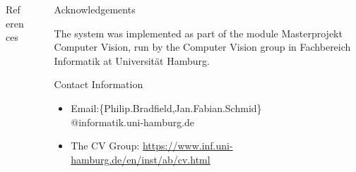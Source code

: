 \documentclass[final]{beamer}
\newlength{\sepwid}
\newlength{\onecolwid}
\newlength{\twocolwid}
\begin{document}
\begin{frame}[t]
\begin{columns}[t]
\begin{column}{\twocolwid}
\begin{columns}[t,totalwidth=\twocolwid]
\begin{column}{\onecolwid}
\begin{block}{References}
		\end{block}
		
	\end{column}	

	\begin{column}{\sepwid}\end{column} %

	\begin{column}{\onecolwid}



		\begin{block}{Acknowledgements}

		\small{The system was implemented as part of the module Masterprojekt Computer Vision, run by the Computer Vision group in Fachbereich Informatik at Universit\"{a}t Hamburg.}

		\end{block}



		\begin{block}{Contact Information}

		\begin{itemize}
			\item Email:\{Philip.Bradfield,Jan.Fabian.Schmid\}\\@informatik.uni-hamburg.de
			\item The CV Group: \href{https://www.inf.uni-hamburg.de/en/inst/ab/cv.html}{https://www.inf.uni-hamburg.de/en/inst/ab/cv.html}
		\end{itemize}


\end{block}
\end{column}
\end{columns}
\end{column}
\end{columns}
\end{frame}
\end{document}
